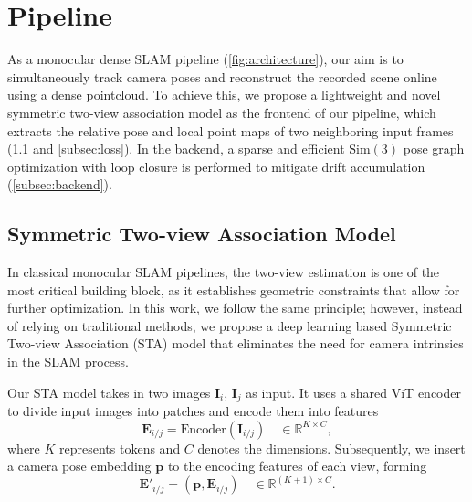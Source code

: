




\section{\ours Pipeline}
\label{sec:method}
As a monocular dense SLAM pipeline (\cref{fig:architecture}), our aim is to simultaneously track camera poses and reconstruct the recorded scene online using a dense pointcloud. To achieve this, we propose a lightweight and novel symmetric two-view association model as the frontend of our pipeline, which extracts the relative pose and local point maps of two neighboring input frames (\cref{subsec:frontend} and \cref{subsec:loss}). In the backend, a sparse and efficient $\mathrm{Sim}(3)$ pose graph optimization with loop closure is performed to mitigate drift accumulation (\cref{subsec:backend}).

\subsection{Symmetric Two-view Association Model}\label{subsec:frontend}
In classical monocular SLAM pipelines, the two-view estimation is one of the most critical building block, as it establishes geometric constraints that allow for further optimization. In this work, we follow the same principle; however, instead of relying on traditional methods, we propose a deep learning based Symmetric Two-view Association (STA) model that eliminates the need for camera intrinsics in the SLAM process. %

Our STA model takes in two images $\bm{I}_i$, $\bm{I}_j$ as input. It uses a shared ViT encoder~\cite{dosovitskiy2020image} to divide input images into patches and encode them into features
\begin{equation*}
    \bm E_{i/j} = \text{Encoder}\left(\bm I_{i/j}\right) \quad \in \mathbb{R}^{K\times C},
\end{equation*}
where $K$ represents tokens and $C$ denotes the dimensions. Subsequently, we insert a camera pose embedding $\bm p$ to the encoding features of each view, forming
\begin{equation*}
    \bm E'_{i/j} = \left(\bm p, \bm E_{i/j}\right) \quad \in \mathbb{R}^{(K+1)\times C}.
\end{equation*}


